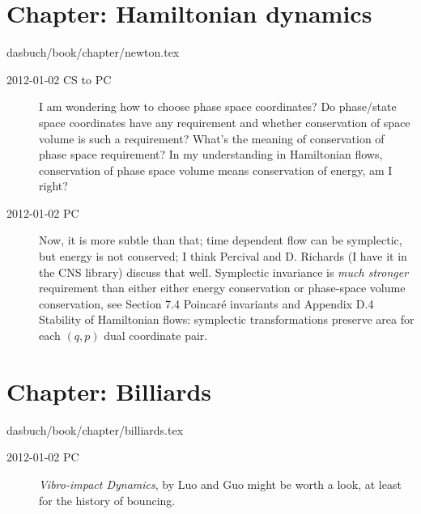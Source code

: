 \section{Chapter: Hamiltonian dynamics}
\label{c-newton}\noindent dasbuch/book/chapter/newton.tex
\begin{description}

\item[2012-01-02 CS to PC]
I am wondering how to choose phase space
coordinates? Do phase/state space coordinates have any requirement and
whether conservation of space volume is such a requirement? What's the
meaning of conservation of phase space requirement? In my understanding
in Hamiltonian flows, conservation of phase space volume means
conservation of energy, am I right?

\item[2012-01-02 PC]
Now, it is more subtle than that; time dependent flow can be symplectic,
but energy is not conserved; I think Percival and D.
Richards (I have it in the
 {CNS library})
discuss that well. Symplectic invariance is \emph{much stronger}
requirement than either either energy conservation or phase-space volume
conservation, see 
{Section 7.4 Poincar\'e invariants} and
 {Appendix D.4
Stability of Hamiltonian flows}: symplectic transformations preserve area
for each $(q,p)$ dual coordinate  pair.

\end{description}


\section{Chapter: Billiards}
\label{c-billiards}\noindent dasbuch/book/chapter/billiards.tex
\begin{description}

\item[2012-01-02 PC]                        \toCB
{\em Vibro-impact Dynamics}, by Luo and Guo might
be worth a look, at least for the history of bouncing.

\end{description}

